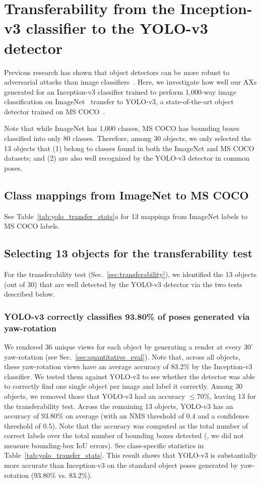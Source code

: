 \documentclass[10pt,twocolumn,letterpaper]{article}
\begin{document}
\section{Transferability from the Inception-v3 classifier to the YOLO-v3 detector}
\label{sec:yolo}

Previous research has shown that object detectors can be more robust to adversarial attacks than image classifiers~\cite{lu2017-standard}.
Here, we investigate how well our AXs generated for an Inception-v3 classifier trained to perform 1,000-way image classification on ImageNet~\cite{russakovsky2015imagenet} transfer to YOLO-v3, a state-of-the-art object detector trained on MS COCO~\cite{lin2014microsoft}.



Note that while ImageNet has 1,000 classes, MS COCO has bounding boxes classified into only 80 classes. 
Therefore, among 30 objects, we only selected the 13 objects that (1) belong to classes found in both the ImageNet and MS COCO datasets; and (2) are also well recognized by the YOLO-v3 detector in common poses.


\subsection{Class mappings from ImageNet to MS COCO}
See Table~\ref{tab:yolo_transfer_stats}a for 13 mappings from ImageNet labels to MS COCO labels.

\subsection{Selecting 13 objects for the transferability test}
For the transferability test (Sec.~\ref{sec:transferability}), we identified the 13 objects (out of 30) that are well detected by the YOLO-v3 detector via the two tests described below.

\subsubsection{YOLO-v3 correctly classifies 93.80\% of poses generated via yaw-rotation}
We rendered 36 unique views for each object by generating a render at every $30^\circ{}$ yaw-rotation (see Sec.~\ref{sec:quantitative_eval}).
Note that, across all objects, these yaw-rotation views have an average accuracy of $83.2\%$ by the Inception-v3 classifier.
We tested them against YOLO-v3 to see whether the detector was able to correctly find one single object per image and label it correctly.
Among 30 objects, we removed those that YOLO-v3 had an accuracy $\leq 70\%$, leaving 13 for the transferability test.
Across the remaining 13 objects, YOLO-v3 has an accuracy of 93.80\% on average (with an NMS threshold of $0.4$ and a confidence threshold of $0.5$).
Note that the accuracy was computed as the total number of correct labels over the total number of bounding boxes detected (\ie, we did not measure bounding-box IoU errors).
See class-specific statistics in Table~\ref{tab:yolo_transfer_stats}.
This result shows that YOLO-v3 is substantially more accurate than Inception-v3 on the standard object poses generated by yaw-rotation (93.80\% vs. 83.2\%).
\end{document}
